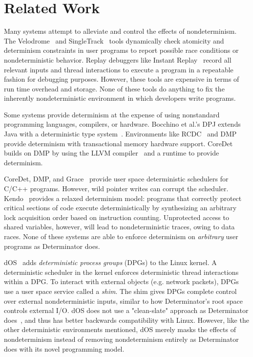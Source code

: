 
\section{Related Work}

Many systems attempt to alleviate and control the effects of nondeterminism.
The Velodrome~\cite{flanagan2008velodrome} and
SingleTrack~\cite{sadowski2009singletrack} tools dynamically check atomicity and
determinism constraints in user programs to report possible race conditions or
nondeterministic behavior. Replay debuggers like Instant
Replay~\cite{leblanc1987debugging} record all relevant inputs and thread
interactions to execute a program in a repeatable fashion for debugging
purposes. However, these tools are expensive in terms of run time overhead and
storage. None of these tools do anything to fix the inherently
nondeterministic environment in which developers write programs.

Some systems provide determinism at the expense of using nonstandard programming
languages, compilers, or hardware.
Bocchino et al.'s DPJ extends Java with a deterministic type
system~\cite{bocchino2009type}. Environments like RCDC~\cite{devietti2011rcdc}
and DMP~\cite{Devietti09} provide determinism with transactional memory hardware
support.
CoreDet~\cite{bergan2010coredet} builds on DMP by using the LLVM
compiler~\cite{lattner2004llvm} and a runtime to provide determinism.

CoreDet, DMP, and Grace~\cite{berger2009grace} provide user space deterministic
schedulers for C/C++ programs. However, wild pointer writes can corrupt the
scheduler. Kendo~\cite{olszewski2009kendo} provides a relaxed determinism model:
programs that correctly protect critical sections of code execute
deterministically by synthesizing an arbitrary lock acquisition order based on
instruction counting. Unprotected access to shared variables, however, will lead
to nondeterministic traces, owing to data races. None of these systems are able
to enforce determinism on \emph{arbitrary} user programs as Determinator does.

dOS~\cite{bergan2010deterministic} adds \emph{deterministic process groups}
(DPGs) to the Linux kernel. A deterministic scheduler in the kernel enforces
deterministic thread interactions within a DPG.
To interact with external objects (e.g. network packets), DPGs use a user
space service called a \emph{shim}. The shim gives DPGs complete control over
external nondeterministic inputs, similar to how Determinator's root space
controls external I/O. dOS does not use a "clean-slate" approach as Determinator
does~\cite{Aviram10}, and thus has better backwards compatibility with Linux.
However, like the other deterministic environments mentioned, dOS merely masks
the effects of nondeterminism instead of removing nondeterminism entirely as
Determinator does with its novel programming model.

\endinput

